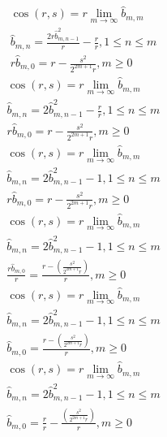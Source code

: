 \documentclass[a4paper,12pt]{report}
\begin{document}
\begin{subequations}
\begin{gather}
\cos(r,s) = r \lim \limits_{m \to \infty} \hat{b}_{m,m} \\
\hat{b}_{m,n} = \frac{2r \hat{b}_{m,n-1}^2}{r} - \frac{r}{r}, 1 \leq n \leq m \\
r \hat{b}_{m,0} = r - \frac{s^2}{2^{2m+1}r}, m \geq 0
\end{gather}
\end{subequations}
\begin{subequations}
\begin{gather}
\cos(r,s) = r \lim \limits_{m \to \infty} \hat{b}_{m,m} \\
\hat{b}_{m,n} = 2 \hat{b}_{m,n-1}^2 - \frac{r}{r}, 1 \leq n \leq m \\
r \hat{b}_{m,0} = r - \frac{s^2}{2^{2m+1}r}, m \geq 0
\end{gather}
\end{subequations}
\begin{subequations}
\begin{gather}
\cos(r,s) = r \lim \limits_{m \to \infty} \hat{b}_{m,m} \\
\hat{b}_{m,n} = 2 \hat{b}_{m,n-1}^2 - 1, 1 \leq n \leq m \\
r \hat{b}_{m,0} = r - \frac{s^2}{2^{2m+1}r}, m \geq 0
\end{gather}
\end{subequations}
\begin{subequations}
\begin{gather}
\cos(r,s) = r \lim \limits_{m \to \infty} \hat{b}_{m,m} \\
\hat{b}_{m,n} = 2 \hat{b}_{m,n-1}^2 - 1, 1 \leq n \leq m \\
\frac{r \hat{b}_{m,0}}{r} = \frac{r - \left(\frac{s^2}{2^{2m+1}r}\right)}{r}, m \geq 0
\end{gather}
\end{subequations}
\begin{subequations}
\begin{gather}
\cos(r,s) = r \lim \limits_{m \to \infty} \hat{b}_{m,m} \\
\hat{b}_{m,n} = 2 \hat{b}_{m,n-1}^2 - 1, 1 \leq n \leq m \\
\hat{b}_{m,0} = \frac{r - \left(\frac{s^2}{2^{2m+1}r}\right)}{r}, m \geq 0
\end{gather}
\end{subequations}
\begin{subequations}
\begin{gather}
\cos(r,s) = r \lim \limits_{m \to \infty} \hat{b}_{m,m} \\
\hat{b}_{m,n} = 2 \hat{b}_{m,n-1}^2 - 1, 1 \leq n \leq m \\
\hat{b}_{m,0} = \frac{r}{r} - \frac{\left(\frac{s^2}{2^{2m+1}r}\right)}{r}, m \geq 0
\end{gather}
\end{subequations}
\end{document}
